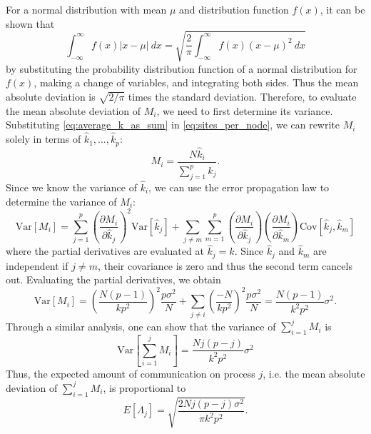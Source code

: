 For a normal distribution with mean $\mu$ and distribution function $f(x)$, it
can be shown that
\begin{equation}
  \int_{-\infty}^{\infty} f(x) \left | x - \mu \right | \: dx =
  \sqrt{\frac{2}{\pi} \int_{-\infty}^{\infty} f(x) \left ( x - \mu \right )^2 \:
    dx}
\end{equation}
by substituting the probability distribution function of a normal distribution
for $f(x)$, making a change of variables, and integrating both sides. Thus the
mean absolute deviation is $\sqrt{2/\pi}$ times the standard
deviation. Therefore, to evaluate the mean absolute deviation of $M_i$, we need
to first determine its variance. Substituting \eqref{eq:average_k_as_sum} in
\eqref{eq:sites_per_node}, we can rewrite $M_i$ solely in terms of $\hat{k}_1,
\dots, \hat{k}_p$:
\begin{equation}
  M_i = \frac{N \hat{k}_i}{\sum\limits_{j=1}^p \hat{k}_j}.
\end{equation}
Since we know the variance of $\hat{k}_i$, we can use the error propagation law
to determine the variance of $M_i$:
\begin{equation}
  \text{Var} \left [ M_i \right ] = \sum_{j=1}^p \left ( \frac{\partial
    M_i}{\partial \hat{k}_j} \right )^2 \text{Var} \left [ \hat{k}_j \right ] +
  \sum\limits_{j \neq m} \sum\limits_{m=1}^p \left ( \frac{\partial
    M_i}{\partial \hat{k}_j} \right ) \left ( \frac{\partial M_i}{\partial
    \hat{k}_m} \right ) \text{Cov} \left [ \hat{k}_j, \hat{k}_m \right ]
\end{equation}
where the partial derivatives are evaluated at $\hat{k}_j = k$. Since
$\hat{k}_j$ and $\hat{k}_m$ are independent if $j \neq m$, their covariance is
zero and thus the second term cancels out. Evaluating the partial derivatives,
we obtain
\begin{equation}
  \text{Var} \left [ M_i \right ] = \left ( \frac{N(p-1)}{kp^2} \right )^2
  \frac{p\sigma^2}{N} + \sum_{j \neq i} \left ( \frac{-N}{kp^2} \right )^2
  \frac{p\sigma^2}{N} = \frac{N(p-1)}{k^2p^2} \sigma^2.
\end{equation}
Through a similar analysis, one can show that the variance of $\sum_{i=1}^j M_i$
is
\begin{equation}
  \text{Var} \left [ \sum_{i=1}^j M_i \right ] = \frac{Nj(p-j)}{k^2p^2} \sigma^2
\end{equation}
Thus, the expected amount of communication on process $j$, i.e. the mean
absolute deviation of $\sum_{i=1}^j M_i$, is proportional to
\begin{equation}
  \label{eq:comm-cost}
  E \left [ \Lambda_j \right ] = \sqrt{\frac{2Nj(p-j)\sigma^2}{\pi k^2p^2}}.
\end{equation}
